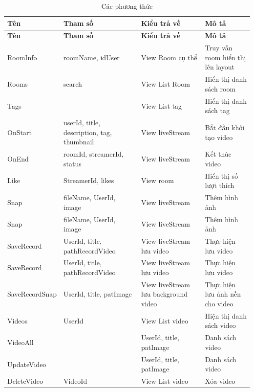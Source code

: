 \begin{center}
\begin{longtabu} to 
\caption{Các phương thức} \\
   \hline \textbf{Tên}  & \textbf{Tham số} & \textbf{Kiểu trả về}  & \textbf{Mô tả}  \\ \hline
   \endfirsthead
   \hline \textbf{Tên}  & \textbf{Tham số} & \textbf{Kiểu trả về}  & \textbf{Mô tả}  \\ \hline
   \endhead
      RoomInfo & roomName, idUser & View Room cụ thể & Truy vấn room hiển thị lên layout
      \\ \hline
      Rooms & search  & View List Room & Hiển thị danh sách room
      \\ \hline
      Tags &   & View List tag  & Hiển thị danh sách tag
      \\ \hline
      OnStart & userId, title, description, tag, thumbnail & View liveStream  & Bắt đầu khởi tạo video
      \\ \hline
      OnEnd & roomId, streamerId, status  & View liveStream  & Kết thúc video
      \\ \hline
      Like & StreamerId, likes  & View room  & Hiển thị số lượt thích
      \\ \hline
      Snap & fileName, UserId, image  & View liveStream  & Thêm hình ảnh
      \\ \hline
      Snap & fileName, UserId, image  & View liveStream  & Thêm hình ảnh
      \\ \hline
      SaveRecord & UserId, title, pathRecordVideo  & View liveStream lưu video  & Thực hiện lưu video
      \\ \hline
      SaveRecord & UserId, title, pathRecordVideo  & View liveStream lưu video  & Thực hiện lưu video
      \\ \hline
      SaveRecordSnap & UserId, title, patImage  & View liveStream lưu background video  & Thực hiện lưu ảnh nền cho video
      \\ \hline
      Videos & UserId  & View List video  & Hiện thị danh sách video
      \\ \hline
      VideoAll &   & UserId, title, patImage  & Danh sách video
      \\ \hline
      UpdateVideo &   & UserId, title, patImage  & Danh sách video
      \\ \hline
      DeleteVideo & VideoId  & View List video  & Xóa video
      \\ \hline
\end{longtabu}
\end{center}

